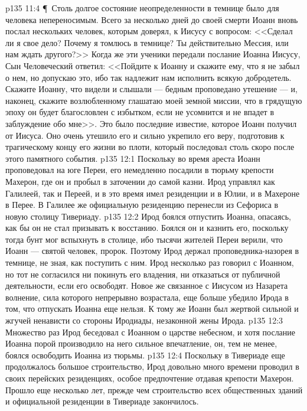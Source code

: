 \vs p135 11:4 \P\ Столь долгое состояние неопределенности в темнице было для человека непереносимым. Всего за несколько дней до своей смерти Иоанн вновь послал нескольких человек, которым доверял, к Иисусу с вопросом: <<Сделал ли я свое дело? Почему я томлюсь в темнице? Ты действительно Мессия, или нам ждать другого?>> Когда же эти ученики передали послание Иоанна Иисусу, Сын Человеческий ответил: <<Пойдите к Иоанну и скажите ему, что я не забыл о нем, но допускаю это, ибо так надлежит нам исполнить всякую добродетель. Скажите Иоанну, что видели и слышали --- бедным проповедано утешение --- и, наконец, скажите возлюбленному глашатаю моей земной миссии, что в грядущую эпоху он будет благословлен с избытком, если не усомнится и не впадет в заблуждение обо мне>>. Это было последние известие, которое Иоанн получил от Иисуса. Оно очень утешило его и сильно укрепило его веру, подготовив к трагическому концу его жизни во плоти, который последовал столь скоро после этого памятного события.
\vs p135 12:1 Поскольку во время ареста Иоанн проповедовал на юге Переи, его немедленно посадили в тюрьму крепости Махерон, где он и пробыл в заточении до самой казни. Ирод управлял как Галилеей, так и Переей, и в это время имел резиденции и в Юлии, и в Махероне в Перее. В Галилее же официальную резиденцию перенесли из Сефориса в новую столицу Тивериаду.
\vs p135 12:2 Ирод боялся отпустить Иоанна, опасаясь, как бы он не стал призывать к восстанию. Боялся он и казнить его, поскольку тогда бунт мог вспыхнуть в столице, ибо тысячи жителей Переи верили, что Иоанн --- святой человек, пророк. Поэтому Ирод держал проповедника\hyp{}назорея в темнице, не зная, как поступить с ним. Ирод несколько раз говорил с Иоанном, но тот не согласился ни покинуть его владения, ни отказаться от публичной деятельности, если его освободят. Новое же связанное с Иисусом из Назарета волнение, сила которого непрерывно возрастала, еще больше убедило Ирода в том, что отпускать Иоанна еще нельзя. К тому же Иоанн был жертвой сильной и жгучей ненависти со стороны Иродиады, незаконной жены Ирода.
\vs p135 12:3 Множество раз Ирод беседовал с Иоанном о царстве небесном, и хотя послание Иоанна порой производило на него сильное впечатление, он, тем не менее, боялся освободить Иоанна из тюрьмы.
\vs p135 12:4 Поскольку в Тивериаде еще продолжалось большое строительство, Ирод довольно много времени проводил в своих перейских резиденциях, особое предпочтение отдавая крепости Махерон. Прошло еще несколько лет, прежде чем строительство всех общественных зданий и официальной резиденции в Тивериаде закончилось.
